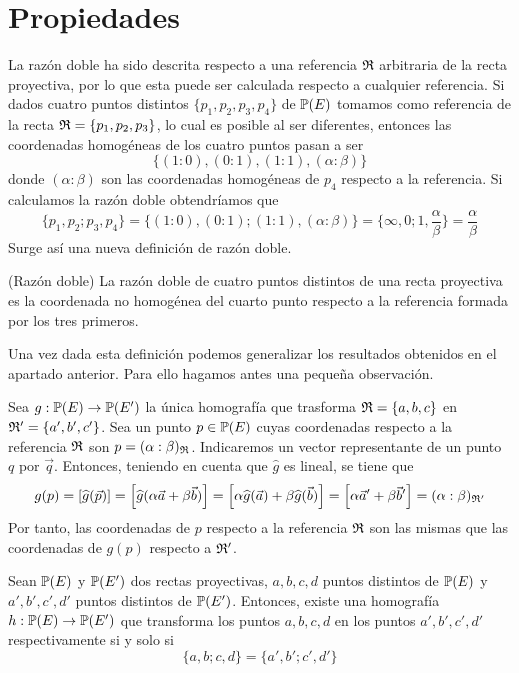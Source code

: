 \section{Propiedades}
La razón doble ha sido descrita respecto a una referencia $\mathfrak{R}$ arbitraria de la recta proyectiva, por lo que esta puede ser calculada respecto a cualquier referencia. Si dados cuatro puntos distintos $\{p_1,p_2,p_3,p_4\}$ de $\mathbb{P}(E)$ tomamos como referencia de la recta $\mathfrak{R}=\{p_1,p_2,p_3\}$, lo cual es posible al ser diferentes, entonces las coordenadas homogéneas de los cuatro puntos pasan a ser
\begin{equation*}
	\{(1:0),(0:1),(1:1),(\alpha:\beta)\}
\end{equation*}
donde $(\alpha:\beta)$ son las coordenadas homogéneas de $p_4$ respecto a la referencia. Si calculamos la razón doble obtendríamos que 
\begin{equation}
	\{p_1,p_2;p_3,p_4\}=\{(1:0),(0:1);(1:1),(\alpha:\beta)\}=\{\infty,0;1,\frac{\alpha}{\beta}\}=\frac{\alpha}{\beta}
\end{equation}
Surge así una nueva definición de razón doble.
\begin{defi}(Razón doble)
	La razón doble de cuatro puntos distintos de una recta proyectiva es la coordenada no homogénea del cuarto punto respecto a la referencia formada por los tres primeros.
\end{defi}
Una vez dada esta definición podemos generalizar los resultados obtenidos en el apartado anterior. Para ello hagamos antes una pequeña observación.
\begin{obs}
	\label{C5_obs_coordenadas_p_g(p)}
	Sea $g:\mathbb{P}(E)\rightarrow \mathbb{P}(E')$ la única homografía que trasforma $\mathfrak{R}=\{a,b,c\}$ en $\mathfrak{R'}=\{a',b',c'\}$. Sea un punto $p\in \mathbb{P}(E)$ cuyas coordenadas respecto a la referencia $\mathfrak{R}$ son $p=(\alpha:\beta)_{\mathfrak{R}}$. Indicaremos un vector representante de un punto $q$ por $\vec{q}$. Entonces, teniendo en cuenta que $\widehat{g}$ es lineal, se tiene que 
	\begin{equation*}
		g(p)=\left [ \widehat{g}(\vec{p}) \right ]=\left [ \widehat{g}(\alpha \vec{a}+\beta \vec{b}) \right ]=\left [ \alpha \widehat{g}( \vec{a})+\beta \widehat{g}(\vec{b}) \right ]=\left [ \alpha \vec{a}'+\beta \vec{b}' \right ]=(\alpha:\beta)_{\mathfrak{R}'}
	\end{equation*}
	Por tanto, las coordenadas de $p$ respecto a la referencia $\mathfrak{R}$ son las mismas que las coordenadas de $g(p)$ respecto a $\mathfrak{R'}$.
\end{obs}
\begin{theo}
	Sean $\mathbb{P}(E)$ y $\mathbb{P}(E')$ dos rectas proyectivas, $a,b,c,d$ puntos distintos de $\mathbb{P}(E)$ y $a',b',c',d'$ puntos distintos de $\mathbb{P}(E')$. Entonces, existe una homografía $h:\mathbb{P}(E)\rightarrow \mathbb{P}(E')$ que transforma los puntos $a,b,c,d$ en los puntos $a',b',c',d'$ respectivamente si y solo si 
	\begin{equation*}
		\{a,b;c,d\}=\{a',b';c',d'\}
	\end{equation*}
\end{theo}
